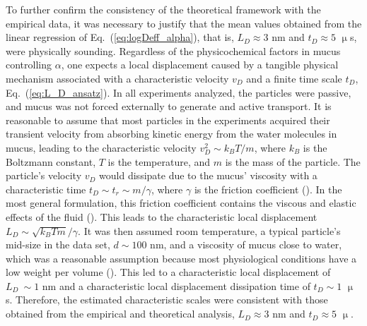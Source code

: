 \documentclass[aps,prl,preprint,superscriptaddress,showkeys,linenumbers]{revtex4-1}
\begin{document}
To further confirm the consistency of the theoretical framework with the empirical data, it was necessary to justify that the mean values obtained from the linear regression of Eq.~(\ref{eq:logDeff_alpha}), that is, $L_D \approx 3$ nm and $t_D \approx 5$ $\upmu$s, were physically sounding. Regardless of the physicochemical factors in mucus controlling $\alpha$, one expects a local displacement caused by a tangible physical mechanism associated with a characteristic velocity $v_D$ and a finite time scale $t_D$, Eq.~(\ref{eq:L_D_ansatz}).
In all experiments analyzed, the particles were passive, and mucus was not forced externally to generate and active transport.
It is reasonable to assume that most particles in the experiments acquired their transient velocity from absorbing kinetic energy from the water molecules in mucus, leading to the characteristic velocity $v_D^2 \sim k_B T/ m$, where $k_B$ is the Boltzmann constant, $T$ is the temperature, and $m$ is the mass of the particle.
The particle's velocity $v_D$ would dissipate due to the mucus' viscosity with a characteristic time $t_D \sim t_r \sim m/\gamma$, where $\gamma$ is the friction coefficient (\cite{Zwanzig2001book}).
In the most general formulation, this friction coefficient contains the viscous and elastic effects of the fluid (\cite{SpagnSPRINGER2015}).
This leads to the characteristic local displacement $L_D \sim \sqrt{k_BT m}/\gamma$. 
It was then assumed room temperature, a typical particle's mid-size in the data set, $d \sim 100$ nm, and a viscosity of mucus close to water, which was a reasonable assumption because most physiological conditions have a low weight per volume (\cite{BarrPNAS2015,Kevin_2019}). This led to a characteristic local displacement of $L_D ~ \sim  1$ nm and a characteristic local displacement dissipation time of $t_D \sim 1 $ $\upmu$s. Therefore, the estimated characteristic scales were consistent with those obtained from the empirical and theoretical analysis, $L_D \approx 3$ nm and $t_D \approx 5$ $\upmu$.
\end{document}
